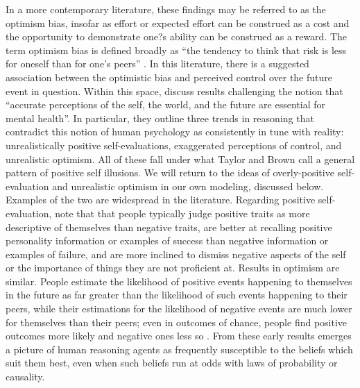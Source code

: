 \documentclass{article}
\begin{document}
In a more contemporary literature, these findings may be referred to as the optimism bias, insofar as effort or expected effort can be construed as a cost and the opportunity to demonstrate one?s ability can be construed as a reward. The term optimism bias is defined broadly as ``the tendency to think that risk is less for oneself than for one's peers'' \citet{Klein2002}. In this literature, there is a suggested association between the optimistic bias and perceived control over the future event in question. Within this space, \citet{Taylor1988} discuss results challenging the notion that ``accurate perceptions of the self, the world, and the future are essential for mental health''. In particular, they outline three trends in reasoning that contradict this notion of human psychology as consistently in tune with reality: unrealistically positive self-evaluations, exaggerated perceptions of control, and unrealistic optimism. All of these fall under what Taylor and Brown call a general pattern of positive self illusions. We will return to the ideas of overly-positive self-evaluation and unrealistic optimism in our own modeling, discussed below. Examples of the two are widespread in the literature. Regarding positive self-evaluation, \citet{Taylor1988} note that that people typically judge positive traits as more descriptive of themselves than negative traits, are better at recalling positive personality information or examples of success than negative information or examples of failure, and are more inclined to dismiss negative aspects of the self or the importance of things they are not proficient at. Results in optimism are similar. People estimate the likelihood of positive events happening to themselves in the future as far greater than the likelihood of such events happening to their peers, while their estimations for the likelihood of negative events are much lower for themselves than their peers; even in outcomes of chance, people find positive outcomes more likely and negative ones less so \citet{Taylor1988}. From these early results emerges a picture of human reasoning agents as frequently susceptible to the beliefs which suit them best, even when such beliefs run at odds with laws of probability or causality. 
\end{document}
